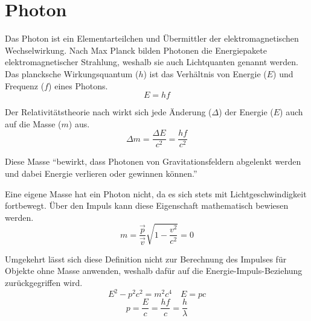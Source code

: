 \section{Photon}
Das Photon ist ein Elementarteilchen und Übermittler der elektromagnetischen Wechselwirkung. Nach Max Planck bilden Photonen die Energiepakete elektromagnetischer Strahlung, weshalb sie auch Lichtquanten genannt werden. Das plancksche Wirkungsquantum ($h$) ist das Verhältnis von Energie ($E$) und Frequenz ($f$) eines Photons.
$$E=hf$$
\begin{vardef}
\end{vardef}

Der Relativitätstheorie nach wirkt sich jede Änderung ($\Delta$) der Energie ($E$) auch auf die Masse ($m$) aus.
$${\Delta}m = \frac{{\Delta}E}{c^2} = \frac{hf}{c^2}$$
\begin{vardef}
\end{vardef}

Diese Masse \enquote{bewirkt, dass Photonen von Gravitationsfeldern abgelenkt werden und dabei Energie verlieren oder gewinnen können.} \cite{ulm:photon}

Eine eigene Masse hat ein Photon nicht, da es sich stets mit Lichtgeschwindigkeit fortbewegt. Über den Impuls kann diese Eigenschaft mathematisch bewiesen werden.
$$m = \frac{\vec{p}}{\vec{v}}\sqrt{1-\frac{v^2}{c^2}} = 0$$
\begin{vardef}
\end{vardef}

Umgekehrt lässt sich diese Definition nicht zur Berechnung des Impulses für Objekte ohne Masse anwenden, weshalb dafür auf die Energie-Impuls-Beziehung zurückgegriffen wird.
$$E^2-p^2c^2 = m^2c^4 \quad E=pc$$
$$p=\frac{E}{c}=\frac{hf}{c}=\frac{h}{\lambda}$$
\begin{vardef}
\end{vardef}


